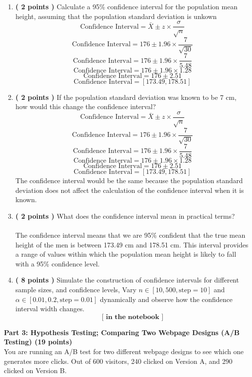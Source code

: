 \documentclass[a3paper,12pt]{extarticle} %
\begin{document}
    \begin{enumerate}
        \item  \textbf{( 2 points )} Calculate a 95\% confidence interval for the population mean height, assuming that the population standard deviation is unkown
        \[
        \text{Confidence Interval} = \bar{X} \pm z \times \frac{\sigma}{\sqrt{n}}
        \]
        \[
        \text{Confidence Interval} = 176 \pm 1.96 \times \frac{7}{\sqrt{30}}
        \]
        \[
        \text{Confidence Interval} = 176 \pm 1.96 \times \frac{7}{5.48}
        \]
        \[
        \text{Confidence Interval} = 176 \pm 1.96 \times 1.28
        \]
        \[
        \text{Confidence Interval} = 176 \pm 2.51
        \]
        \[
        \text{Confidence Interval} = [173.49, 178.51]
        \]
        \item \textbf{( 2 points )} If the population standard deviation was known to be 7 cm, how would this change the confidence interval?
        \[
        \text{Confidence Interval} = \bar{X} \pm z \times \frac{\sigma}{\sqrt{n}}
        \]
        \[
        \text{Confidence Interval} = 176 \pm 1.96 \times \frac{7}{\sqrt{30}}
        \]
        \[
        \text{Confidence Interval} = 176 \pm 1.96 \times \frac{7}{5.48}
        \]
        \[
        \text{Confidence Interval} = 176 \pm 1.96 \times 1.28
        \]
        \[
        \text{Confidence Interval} = 176 \pm 2.51
        \]
        \[
        \text{Confidence Interval} = [173.49, 178.51]
        \]
        The confidence interval would be the same because the population standard deviation does not affect the calculation of the confidence interval when it is known.
        \item \textbf{( 2 points )} What does the confidence interval mean in practical terms?
        \\\\ The confidence interval means that we are 95\% confident that the true mean height of the men is between 173.49 cm and 178.51 cm. This interval provides a range of values within which the population mean height is likely to fall with a 95\% confidence level.
        \item \textbf{( 8 points )} Simulate the construction of confidence intervals for different sample sizes, and confidence levels,  Vary \(n \in [10, 500, \text{step}=10]\) and \(\alpha \in [0.01, 0.2, \text{step}=0.01]\) dynamically and observe how the confidence interval width changes.
        \[
        \textbf{[ in the notebook ]}
        \]
    \end{enumerate}
    \subitem \textbf{Part 3: Hypothesis Testing; Comparing Two Webpage Designs (A/B Testing) (19 points)}
    \\ You are running an A/B test for two different webpage designs to see which one generates more clicks.
    Out of 600 visitors, 240 clicked on Version A, and 290 clicked on Version B.
\end{document}

